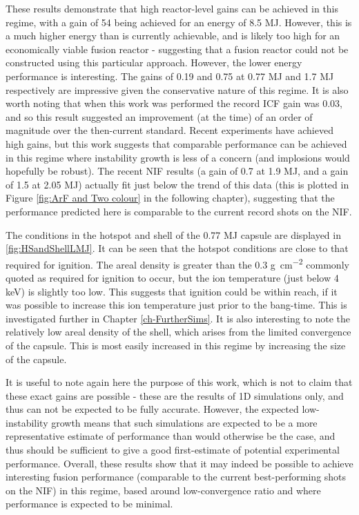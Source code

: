 These results demonstrate that high reactor-level gains can be achieved in this regime, with a gain of 54 being achieved for an energy of 8.5 \unit{\mega\joule}. However, this is a much higher energy than is currently achievable, and is likely too high for an economically viable fusion reactor - suggesting that a fusion reactor could not be constructed using this particular approach. However, the lower energy performance is interesting. The gains of 0.19 and 0.75 at 0.77 \unit{\mega\joule} and 1.7 \unit{\mega\joule} respectively are impressive given the conservative nature of this regime. It is also worth noting that when this work was performed the record ICF gain was 0.03, and so this result suggested an improvement (at the time) of an order of magnitude over the then-current standard. Recent experiments have achieved high gains, but this work suggests that comparable performance can be achieved in this regime where instability growth is less of a concern (and implosions would hopefully be robust). The recent NIF results (a gain of 0.7 at 1.9 MJ, and a gain of 1.5 at 2.05 MJ) actually fit just below the trend of this data (this is plotted in Figure \ref{fig:ArF and Two colour} in the following chapter), suggesting that the performance predicted here is comparable to the current record shots on the NIF.

The conditions in the hotspot and shell of the 0.77 \unit{\mega\joule} capsule are displayed in \ref{fig:HSandShellLMJ}. It can be seen that the hotspot conditions are close to that required for ignition. The areal density is greater than the 0.3 \unit{\gram\per\centi\meter\squared} commonly quoted as required for ignition to occur, but the ion temperature (just below 4 keV) is slightly too low. This suggests that ignition could be within reach, if it was possible to increase this ion temperature just prior to the bang-time. This is investigated further in Chapter \ref{ch-FurtherSims}. It is also interesting to note the relatively low areal density of the shell, which arises from the limited convergence of the capsule. This is most easily increased in this regime by increasing the size of the capsule.

It is useful to note again here the purpose of this work, which is not to claim that these exact gains are possible - these are the results of 1D simulations only, and thus can not be expected to be fully accurate. However, the expected low-instability growth means that such simulations are expected to be a more representative estimate of performance than would otherwise be the case, and thus should be sufficient to give a good first-estimate of potential experimental performance. Overall, these results show that it may indeed be possible to achieve interesting fusion performance (comparable to the current best-performing shots on the NIF) in this regime, based around low-convergence ratio and where performance is expected to be minimal.

